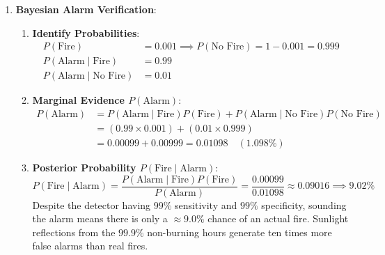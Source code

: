 \begin{enumerate}
    \item \textbf{Bayesian Alarm Verification}:
    \begin{enumerate}[label=(\alph*)]
        \item \textbf{Identify Probabilities}:
        \begin{align*}
        P(\text{Fire}) &= 0.001 \implies P(\text{No Fire}) = 1 - 0.001 = 0.999 \\
        P(\text{Alarm} \mid \text{Fire}) &= 0.99 \\
        P(\text{Alarm} \mid \text{No Fire}) &= 0.01
        \end{align*}
        \item \textbf{Marginal Evidence $P(\text{Alarm})$}:
        \begin{align*}
        P(\text{Alarm}) &= P(\text{Alarm} \mid \text{Fire})P(\text{Fire}) + P(\text{Alarm} \mid \text{No Fire})P(\text{No Fire}) \\
        &= (0.99 \times 0.001) + (0.01 \times 0.999) \\
        &= 0.00099 + 0.00999 = \mathbf{0.01098} \quad (1.098\%)
        \end{align*}
        \item \textbf{Posterior Probability $P(\text{Fire} \mid \text{Alarm})$}:
        \begin{equation*}
        P(\text{Fire} \mid \text{Alarm}) = \frac{P(\text{Alarm} \mid \text{Fire})P(\text{Fire})}{P(\text{Alarm})} = \frac{0.00099}{0.01098} \approx \mathbf{0.09016} \implies \mathbf{9.02\%}
        \end{equation*}
        Despite the detector having $99\%$ sensitivity and $99\%$ specificity, sounding the alarm means there is only a $\approx 9.0\%$ chance of an actual fire. Sunlight reflections from the $99.9\%$ non-burning hours generate ten times more false alarms than real fires.
    \end{enumerate}


\end{enumerate}
